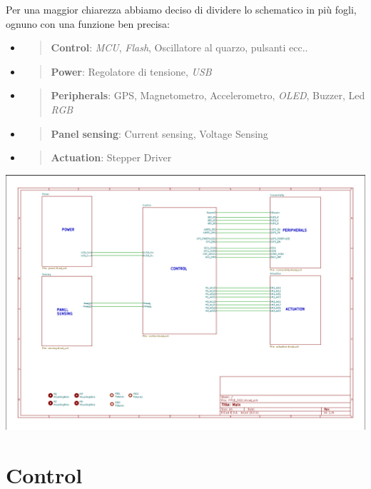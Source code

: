 \noindent Per una maggior chiarezza abbiamo deciso di dividere lo schematico in
più fogli, ognuno con una funzione ben precisa:

\begin{itemize}
\item
  \begin{quote}
  \textbf{Control}: \emph{MCU}, \emph{Flash}, Oscillatore al quarzo,
  pulsanti ecc..
  \end{quote}
\item
  \begin{quote}
  \textbf{Power}: Regolatore di tensione, \emph{USB}
  \end{quote}
\item
  \begin{quote}
  \textbf{Peripherals}: GPS, Magnetometro, Accelerometro, \emph{OLED},
  Buzzer, Led \emph{RGB}
  \end{quote}
\item
  \begin{quote}
  \textbf{Panel} \textbf{sensing}: Current sensing, Voltage Sensing
  \end{quote}
\item
  \begin{quote}
  \textbf{Actuation}: Stepper Driver
  \end{quote}
\end{itemize}

\begin{center}
\includegraphics[scale=0.45]{figures/image32.png}
\captionsetup{type=figure}
\end{center}

\hypertarget{control}{%
\section{Control}\label{control}}

